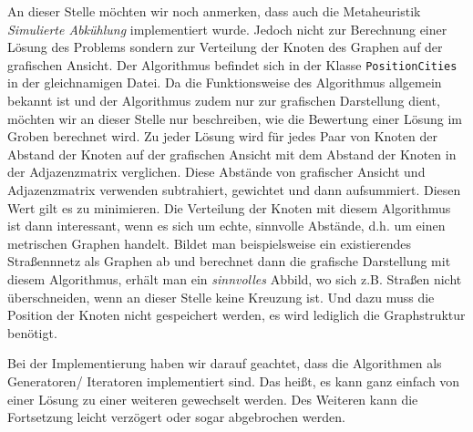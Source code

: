 An dieser Stelle möchten wir noch anmerken, dass auch die Metaheuristik \emph{Simulierte Abkühlung} implementiert wurde. Jedoch nicht zur Berechnung einer Lösung des Problems sondern zur Verteilung der Knoten des Graphen auf der grafischen Ansicht. Der Algorithmus befindet sich in der Klasse \texttt{PositionCities} in der gleichnamigen Datei. Da die Funktionsweise des Algorithmus allgemein bekannt ist und der Algorithmus zudem nur zur grafischen Darstellung dient, möchten wir an dieser Stelle nur beschreiben, wie die Bewertung einer Lösung im Groben berechnet wird. Zu jeder Lösung wird für jedes Paar von Knoten der Abstand der Knoten auf der grafischen Ansicht mit dem Abstand der Knoten in der Adjazenzmatrix verglichen. Diese Abstände von grafischer Ansicht und Adjazenzmatrix verwenden subtrahiert, gewichtet und dann aufsummiert. Diesen Wert gilt es zu minimieren. Die Verteilung der Knoten mit diesem Algorithmus ist dann interessant, wenn es sich um echte, sinnvolle Abstände, d.h. um einen metrischen Graphen handelt. Bildet man beispielsweise ein existierendes Straßennnetz als Graphen ab und berechnet dann die grafische Darstellung mit diesem Algorithmus, erhält man ein \emph{sinnvolles} Abbild, wo sich z.B. Straßen nicht überschneiden, wenn an dieser Stelle keine Kreuzung ist. Und dazu muss die Position der Knoten nicht gespeichert werden, es wird lediglich die Graphstruktur benötigt.

Bei der Implementierung haben wir darauf geachtet, dass die Algorithmen als Generatoren/ Iteratoren implementiert sind. Das heißt, es kann ganz einfach von einer Lösung zu einer weiteren gewechselt werden. Des Weiteren kann die Fortsetzung leicht verzögert oder sogar abgebrochen werden.



